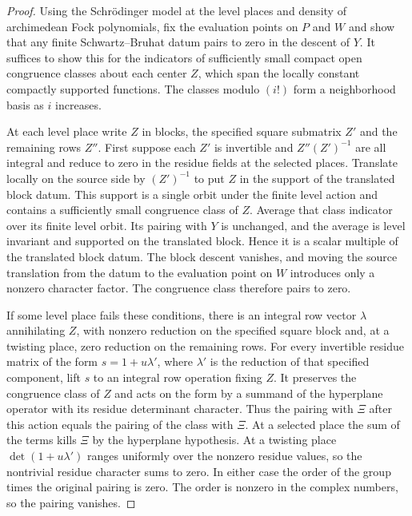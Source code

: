 \begin{proof}
Using the Schrödinger model at the level places and density of archimedean Fock polynomials, fix the evaluation points on $P$ and $W$ and show that any finite Schwartz--Bruhat datum pairs to zero in the descent of $Y$. It suffices to show this for the indicators of sufficiently small compact open congruence classes about each center $Z$, which span the locally constant compactly supported functions. The classes modulo $(i!)$ form a neighborhood basis as $i$ increases.

At each level place write $Z$ in blocks, the specified square submatrix $Z'$ and the remaining rows $Z''$. First suppose each $Z'$ is invertible and $Z''(Z')^{-1}$ are all integral and reduce to zero in the residue fields at the selected places. Translate locally on the source side by $(Z')^{-1}$ to put $Z$ in the support of the translated block datum. This support is a single orbit under the finite level action and contains a sufficiently small congruence class of $Z$. Average that class indicator over its finite level orbit. Its pairing with $Y$ is unchanged, and the average is level invariant and supported on the translated block. Hence it is a scalar multiple of the translated block datum. The block descent vanishes, and moving the source translation from the datum to the evaluation point on $W$ introduces only a nonzero character factor. The congruence class therefore pairs to zero.

If some level place fails these conditions, there is an integral row vector $\lambda$ annihilating $Z$, with nonzero reduction on the specified square block and, at a twisting place, zero reduction on the remaining rows. For every invertible residue matrix of the form $s=1+u\lambda'$, where $\lambda'$ is the reduction of that specified component, lift $s$ to an integral row operation fixing $Z$. It preserves the congruence class of $Z$ and acts on the form by a summand of the hyperplane operator with its residue determinant character. Thus the pairing with $\Xi$ after this action equals the pairing of the class with $\Xi$. At a selected place the sum of the terms kills $\Xi$ by the hyperplane hypothesis. At a twisting place $\det(1+u\lambda')$ ranges uniformly over the nonzero residue values, so the nontrivial residue character sums to zero. In either case the order of the group times the original pairing is zero. The order is nonzero in the complex numbers, so the pairing vanishes.


\end{proof}

